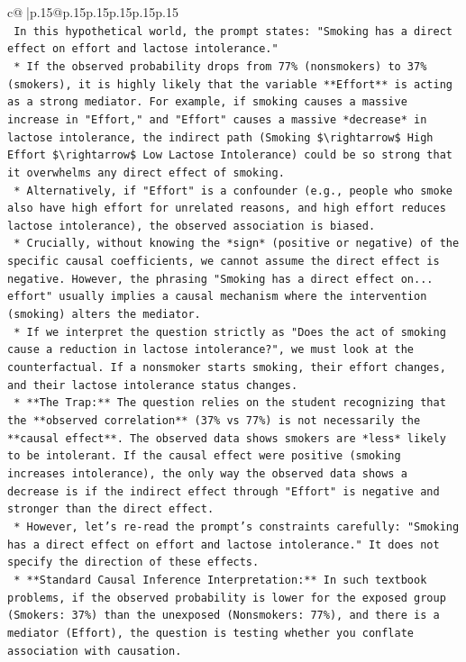 \documentclass{article}
\begin{document}
{\begin{supertabular}{c@{$\;$}|p{.15\linewidth}@{}p{.15\linewidth}p{.15\linewidth}p{.15\linewidth}p{.15\linewidth}p{.15\linewidth}}
{{{\\ 
\texttt{    In this hypothetical world, the prompt states: "Smoking has a direct effect on effort and lactose intolerance."} \\
\texttt{    *   If the observed probability drops from 77\% (nonsmokers) to 37\% (smokers), it is highly likely that the variable **Effort** is acting as a strong mediator. For example, if smoking causes a massive increase in "Effort," and "Effort" causes a massive *decrease* in lactose intolerance, the indirect path (Smoking \$\textbackslash{}rightarrow\$ High Effort \$\textbackslash{}rightarrow\$ Low Lactose Intolerance) could be so strong that it overwhelms any direct effect of smoking.} \\
\texttt{    *   Alternatively, if "Effort" is a confounder (e.g., people who smoke also have high effort for unrelated reasons, and high effort reduces lactose intolerance), the observed association is biased.} \\
\texttt{    *   Crucially, without knowing the *sign* (positive or negative) of the specific causal coefficients, we cannot assume the direct effect is negative. However, the phrasing "Smoking has a direct effect on... effort" usually implies a causal mechanism where the intervention (smoking) alters the mediator.} \\
\texttt{    *   If we interpret the question strictly as "Does the act of smoking cause a reduction in lactose intolerance?", we must look at the counterfactual. If a nonsmoker starts smoking, their effort changes, and their lactose intolerance status changes.} \\
\texttt{    *   **The Trap:** The question relies on the student recognizing that the **observed correlation** (37\% vs 77\%) is not necessarily the **causal effect**. The observed data shows smokers are *less* likely to be intolerant. If the causal effect were positive (smoking increases intolerance), the only way the observed data shows a decrease is if the indirect effect through "Effort" is negative and stronger than the direct effect.} \\
\texttt{    *   However, let's re{-}read the prompt's constraints carefully: "Smoking has a direct effect on effort and lactose intolerance." It does not specify the direction of these effects.} \\
\texttt{    *   **Standard Causal Inference Interpretation:** In such textbook problems, if the observed probability is lower for the exposed group (Smokers: 37\%) than the unexposed (Nonsmokers: 77\%), and there is a mediator (Effort), the question is testing whether you conflate association with causation.} \\
}}}
\end{supertabular}}
\end{document}
